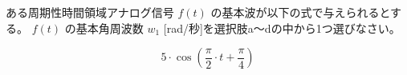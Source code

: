 ある周期性時間領域アナログ信号 $f(t)$ の基本波が以下の式で与えられるとする。
$f(t)$ の基本角周波数 $w_1$ [rad/秒]を選択肢a〜dの中から1つ選びなさい。

\[
5 \cdot \cos \left ( \frac{\pi}{2} \cdot t + \frac{\pi}{4} \right )
\]
